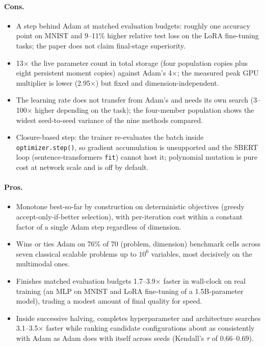 \paragraph{Cons.}
\begin{itemize}[leftmargin=*]
\item A step behind Adam at matched evaluation budgets: roughly one accuracy point on MNIST and 9--11\% higher relative test loss on the LoRA fine-tuning tasks; the paper does not claim final-stage superiority.
\item 13$\times$ the live parameter count in total storage (four population copies plus eight persistent moment copies) against Adam's 4$\times$; the measured peak GPU multiplier is lower (2.95$\times$) but fixed and dimension-independent.
\item The learning rate does not transfer from Adam's and needs its own search (3--100$\times$ higher depending on the task); the four-member population shows the widest seed-to-seed variance of the nine methods compared.
\item Closure-based step: the trainer re-evaluates the batch inside \texttt{optimizer.step()}, so gradient accumulation is unsupported and the SBERT loop (sentence-transformers \texttt{fit}) cannot host it; polynomial mutation is pure cost at network scale and is off by default.
\end{itemize}

\paragraph{Pros.}
\begin{itemize}[leftmargin=*]
\item Monotone best-so-far by construction on deterministic objectives (greedy accept-only-if-better selection), with per-iteration cost within a constant factor of a single Adam step regardless of dimension.
\item Wins or ties Adam on 76\% of 70 (problem, dimension) benchmark cells across seven classical scalable problems up to $10^6$ variables, most decisively on the multimodal ones.
\item Finishes matched evaluation budgets 1.7--3.9$\times$ faster in wall-clock on real training (an MLP on MNIST and LoRA fine-tuning of a 1.5B-parameter model), trading a modest amount of final quality for speed.
\item Inside successive halving, completes hyperparameter and architecture searches 3.1--3.5$\times$ faster while ranking candidate configurations about as consistently with Adam as Adam does with itself across seeds (Kendall's $\tau$ of 0.66--0.69).
\end{itemize}

